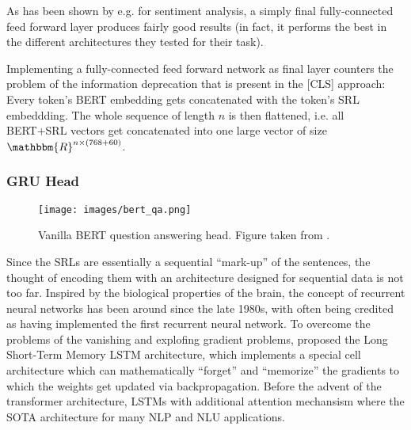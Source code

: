 As has been shown by e.g. \cite{myagmar2019transferable} for sentiment analysis, a simply final
fully-connected feed forward layer produces fairly good results (in fact, it performs the best
in the different architectures they tested for their task).

Implementing a fully-connected feed forward network as final layer counters the problem
of the information deprecation that is present in the [CLS] approach: Every token's BERT
embedding gets concatenated with the token's SRL embeddding. The whole sequence of length
$n$ is then flattened, i.e. all BERT+SRL vectors get concatenated into one large vector
of size $\mathbbm{R}^{n\times(768+60)}$.


\subsubsection{GRU Head}

\begin{wrapfigure}[17]{r}{0.45\linewidth}
  \begin{center}
    \texttt{[image: images/bert\_qa.png]}
  \end{center}
  \caption[BERT Q\&A]{Vanilla BERT question answering head. Figure taken from \citep{devlin2018bert}.}
  \label{fig:bert-qa}
\end{wrapfigure}

Since the SRLs are essentially a sequential ``mark-up'' of the sentences, the thought of
encoding them with an architecture designed for sequential data is not too far. Inspired
by the biological properties of the brain, the concept of recurrent neural networks has
been around since the late 1980s, with \citep{hopfield1982neural} often being credited
as having implemented the first recurrent neural network. To overcome the problems of
the vanishing and explofing gradient problems, \citep{hochreiter1997long} proposed the
Long Short-Term Memory LSTM architecture, which implements a special cell architecture
which can mathematically ``forget'' and ``memorize'' the gradients to which the weights
get updated via backpropagation. Before the advent of the transformer architecture, LSTMs
with additional attention mechansism where the SOTA architecture for many NLP and NLU
applications.


